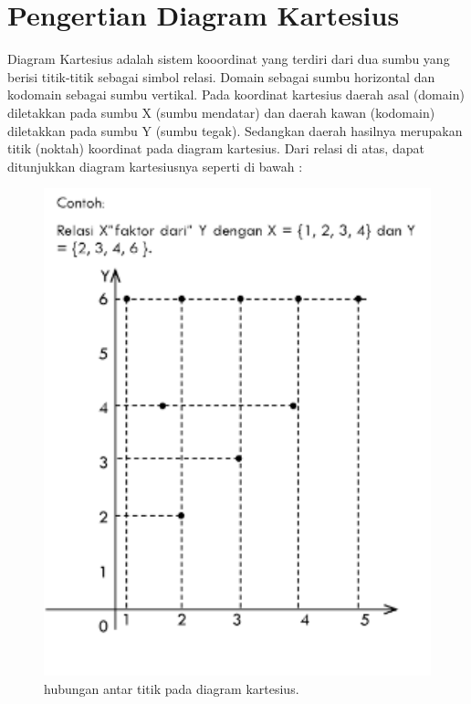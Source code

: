 
\section{Pengertian Diagram Kartesius}
Diagram Kartesius adalah sistem kooordinat yang terdiri dari dua sumbu yang berisi titik-titik sebagai simbol relasi.
Domain sebagai sumbu horizontal dan kodomain sebagai sumbu vertikal.
Pada koordinat kartesius daerah asal (domain) diletakkan pada sumbu X (sumbu mendatar) dan daerah kawan (kodomain) diletakkan pada sumbu Y (sumbu tegak).
Sedangkan daerah hasilnya merupakan titik (noktah) koordinat pada diagram kartesius. Dari relasi di atas, dapat ditunjukkan diagram kartesiusnya seperti di bawah :
\begin{figure}[ht]
	\centerline{\includegraphics[width=1\textwidth]{figures/rahmi1.PNG}}
	\caption{hubungan antar titik pada diagram kartesius.}
	\label{rahmi1}
	\end{figure}

